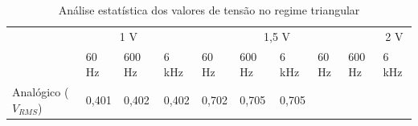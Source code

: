 \documentclass[14pt, oneside]{book}
\theoremstyle{definition}
\begin{document}
                \begin{table}[H]
                    \centering
                    {\renewcommand\arraystretch{1.25}
                    \caption{Análise estatística dos valores de tensão no regime triangular}
                    \begin{tabular}{ l l l l l l l l l l }
                        \cline{1-1}\cline{2-2}\cline{3-3}\cline{4-4}\cline{5-5}\cline{6-6}\cline{7-7}\cline{8-8}\cline{9-9}\cline{10-10}  
                            \multicolumn{1}{|p{3.033cm}|}{{  \centering }} &
                            \multicolumn{3}{p{3.883cm}|}{\centering \ \ \ \ \ \ 1 V  } &
                            \multicolumn{3}{p{3.117cm}|}{\ \ \ \ \ \ \ \ \ \ \ 1,5  V \centering } &
                            \multicolumn{3}{p{2.733cm}|}{\ \ \ \ \ \ \ \ \ \ \ \ 2 V \centering }
                      \\  
                        \cline{2-2}\cline{3-3}\cline{4-4}\cline{5-5}\cline{6-6}\cline{7-7}\cline{8-8}\cline{9-9}\cline{10-10}  
                            \multicolumn{1}{|p{1.0cm}|}{} &
                            \multicolumn{1}{p{1.367cm}|}{60 Hz \centering } &
                            \multicolumn{1}{p{1.333cm}|}{600 Hz \centering } &
                            \multicolumn{1}{p{1.000cm}|}{6 kHz \centering } &
                            \multicolumn{1}{p{1.350cm}|}{60 Hz \centering } &
                            \multicolumn{1}{p{1.050cm}|}{600 Hz \centering } &
                            \multicolumn{1}{p{0.983cm}|}{6 kHz \centering } &
                            \multicolumn{1}{p{1.350cm}|}{60 Hz \centering } &
                            \multicolumn{1}{p{1.050cm}|}{600 Hz \centering } &
                            \multicolumn{1}{p{0.933cm}|}{6 kHz \centering }
                      \\  
                        \cline{1-1}\cline{2-2}\cline{3-3}\cline{4-4}\cline{5-5}\cline{6-6}\cline{7-7}\cline{8-8}\cline{9-9}\cline{10-10}  
                            \multicolumn{1}{|p{3.033cm}|}{Analógico ($V_{RMS}$) \centering } &
                            \multicolumn{1}{p{1.367cm}|}{0,401 \centering } &
                            \multicolumn{1}{p{1.333cm}|}{0,402 \centering } &
                            \multicolumn{1}{p{1.000cm}|}{0,402 \centering } &
                            \multicolumn{1}{p{1.350cm}|}{0,702 \centering } &
                            \multicolumn{1}{p{1.050cm}|}{0,705 \centering } &
                            \multicolumn{1}{p{0.983cm}|}{0,705 \centering } &

\end{tabular}}
\end{table}
\end{document}
